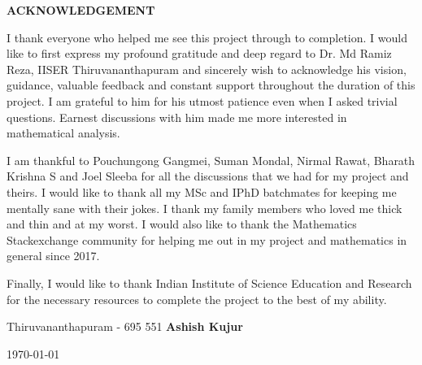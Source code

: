 \begin{center}
{\large{\bf{ACKNOWLEDGEMENT}}}
\end{center}
\thispagestyle{empty}


\noindent
I thank everyone who helped me see this project through to completion. I would like to first express my profound gratitude and deep regard to Dr. Md Ramiz Reza, IISER Thiruvananthapuram and sincerely wish to acknowledge his vision, guidance, valuable feedback and constant support throughout the duration of this project. I am grateful to him for his utmost patience even when I asked trivial questions. Earnest discussions with him made me more interested in mathematical analysis.

I am thankful to Pouchungong Gangmei, Suman Mondal, Nirmal Rawat, Bharath Krishna S and Joel Sleeba for all the discussions that we had for my project and theirs. I would like to thank all my MSc and IPhD batchmates for keeping me mentally sane with their jokes. I thank my family members who loved me thick and thin and at my worst. I would also like to thank the Mathematics Stackexchange community for helping me out in my project and mathematics in general since 2017.

Finally, I would like to thank Indian Institute of Science Education and Research for the necessary resources to complete the project to the best of my ability.



\vspace{4cm} %

\noindent Thiruvananthapuram - 695 551 \hfill \textbf{Ashish Kujur}

\noindent \today \hfill

\clearpage
